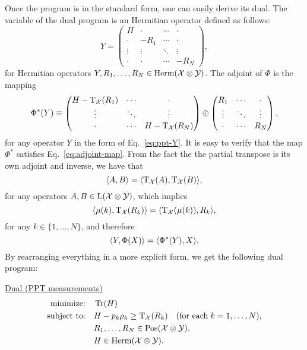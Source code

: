 Once the program is in the standard form, one can easily derive its dual.
The variable of the dual program is an Hermitian operator defined as follows:
\begin{equation}
\label{eq:ppt-Y}
  Y = 
  \begin{pmatrix}
      H & \cdot & \cdots & \cdot \\
        \cdot  & -R_{1} & \cdots & \cdot\\
        \vdots & \vdots & \ddots & \vdots\\
        \cdot  & \cdot & \cdots & -R_{N}
    \end{pmatrix},
\end{equation}
for Hermitian operators $Y, R_{1}, \ldots, R_{N} \in \mathrm{Herm}(\mathcal{X}\otimes\mathcal{Y})$.
The adjoint of $\Phi$ is the mapping
\begin{equation}
  \Phi^{\ast}(Y) \equiv 
    \begin{pmatrix}
      H - \operatorname{T}_{\mathcal{X}}(R_{1}) & \cdots & \cdot\\
      \vdots & \ddots & \vdots\\
      \cdot & \cdots & H - \operatorname{T}_{\mathcal{X}}(R_{N})\\
    \end{pmatrix}
    \oplus
    \begin{pmatrix}
      R_{1} & \cdots & \cdot\\
      \vdots & \ddots & \vdots\\
      \cdot & \cdots & R_{N}\\
    \end{pmatrix},
\end{equation}
for any operator $Y$ in the form of Eq.~\eqref{eq:ppt-Y}.
It is easy to verify that the map $\Phi^{\ast}$ satisfies Eq.~\eqref{eq:adjoint-map}.
From the fact the the partial transpose is its own adjoint and inverse, we have 
that
\begin{equation}
  \langle A , B\rangle = \langle \operatorname{T}_{\mathcal{X}}(A) , \operatorname{T}_{\mathcal{X}}(B)\rangle,
\end{equation}
for any operators $A, B\in\mathrm{L}(\mathcal{X}\otimes\mathcal{Y})$, which implies
\begin{equation}
\langle \mu(k) , \operatorname{T}_{\mathcal{X}}(R_{k})\rangle = \langle \operatorname{T}_{\mathcal{X}}(\mu(k)) , R_{k}\rangle,
\end{equation}
for any $k \in \{1, \ldots, N\}$, and therefore
\begin{equation}
  \langle Y , \Phi(X)\rangle = \langle \Phi^{\ast}(Y) , X\rangle.
\end{equation}
By rearranging everything in a more explicit form, we get the following dual program:
\begin{center}
\underline{Dual (PPT measurements)}
\begin{equation}
  \label{eq:ppt-dual-problem}
  \begin{split}
    \text{minimize:} \quad & \operatorname{Tr}(H)\\
    \text{subject to:} \quad & H-p_k\rho_k \geq \operatorname{T}_{\mathcal{X}}(R_{k})
    \quad(\text{for each}\;k = 1,\ldots,N),\\
    \quad & R_{1}, \ldots, R_{N} \in \mathrm{Pos}(\mathcal{X}\otimes\mathcal{Y}),\\
    \quad & H \in \mathrm{Herm}(\mathcal{X}\otimes\mathcal{Y}).
  \end{split}
\end{equation}
\end{center}

